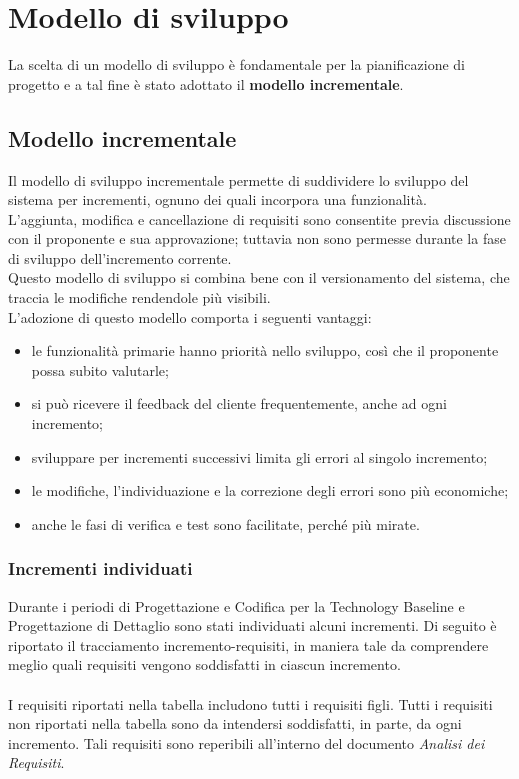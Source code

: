\section{Modello di sviluppo}
La scelta di un modello di sviluppo è fondamentale per la pianificazione di 
progetto e a tal fine è stato adottato il \textbf{modello incrementale}.

\subsection{Modello incrementale}
Il modello di sviluppo incrementale permette di suddividere lo sviluppo del sistema per 
incrementi, ognuno dei quali incorpora una funzionalità. \\
L'aggiunta, modifica e cancellazione di requisiti sono consentite previa discussione con il proponente e sua 
approvazione; tuttavia non sono permesse durante la fase di sviluppo dell'incremento corrente.\\
Questo modello di sviluppo si combina bene con il versionamento del sistema, che traccia le modifiche rendendole più visibili.\\
L'adozione di questo modello comporta i seguenti vantaggi:
\begin{itemize}
	\item le funzionalità primarie hanno priorità nello sviluppo, così che il proponente possa subito valutarle;
	\item si può ricevere il feedback del cliente frequentemente, anche ad ogni incremento;
	\item sviluppare per incrementi successivi limita gli errori al singolo incremento;
	\item le modifiche, l'individuazione e la correzione degli errori sono più economiche;
	\item anche le fasi di verifica e test sono facilitate, perché più mirate.
\end{itemize}
\subsubsection{Incrementi individuati} Durante i periodi di Progettazione e Codifica per la Technology Baseline e Progettazione di Dettaglio sono stati individuati alcuni incrementi. Di seguito è riportato il tracciamento incremento-requisiti, in maniera tale da comprendere meglio quali requisiti vengono soddisfatti in ciascun incremento. \\ \\
I requisiti riportati nella tabella includono tutti i requisiti figli. Tutti i requisiti non riportati nella tabella sono da intendersi soddisfatti, in parte, da ogni incremento. Tali requisiti sono reperibili all'interno del documento \textit{Analisi dei Requisiti}.

